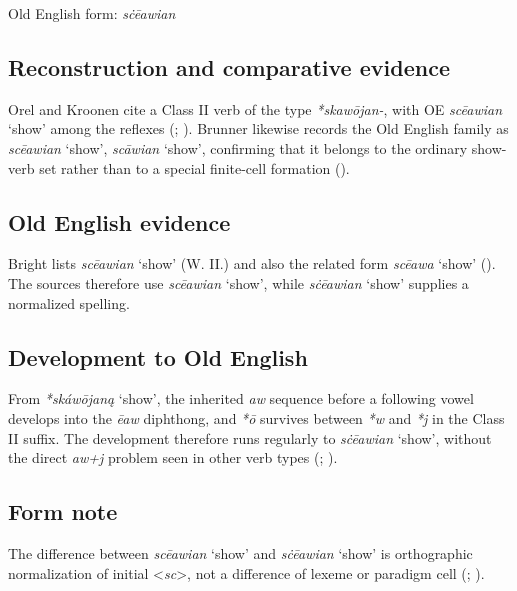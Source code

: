 \documentclass[
  british,
  a4paper,
  openany]{book}
\providecommand{\Recon}[1]{\emph{*#1}}
{\catcode`→=\active \global\def→{\ensuremath{\rightarrow}}}
\providecommand{\Recon}[1]{\emph{*#1}}
{\catcode`→=\active \global\def→{\ensuremath{\rightarrow}}}
\begin{document}
Old English form: \emph{sċēawian}

\subsection{Reconstruction and comparative
evidence}\label{reconstruction-and-comparative-evidence-45}

Orel and Kroonen cite a Class II verb of the type {\emph{*skawōjan-}},
with OE {\emph{scēawian}} `show' among the reflexes
(; ). Brunner likewise records the Old English family as
{\emph{scēawian}} `show', {\emph{scāwian}} `show', confirming that it
belongs to the ordinary show-verb set rather than to a special
finite-cell formation ().

\subsection{Old English evidence}\label{old-english-evidence-45}

Bright lists {\emph{scēawian}} `show' (W. II.) and also the related form
{\emph{scēawa}} `show' (). The sources therefore use {\emph{scēawian}} `show', while
{\emph{sċēawian}} `show' supplies a normalized spelling.

\subsection{Development to Old
English}\label{development-to-old-english-45}

From {\Recon{skáwōjaną} `show'}, the inherited \emph{aw} sequence before
a following vowel develops into the \emph{ēaw} diphthong, and \emph{*ō}
survives between \emph{*w} and \emph{*j} in the Class II suffix. The
development therefore runs regularly to {\emph{sċēawian}} `show',
without the direct \emph{aw+j} problem seen in other verb types
(;
).

\subsection{Form note}\label{form-note-16}

The difference between {\emph{scēawian}} `show' and {\emph{sċēawian}}
`show' is orthographic normalization of initial
\textless{}\emph{sc}\textgreater, not a difference of lexeme or paradigm
cell (;
).
\end{document}
